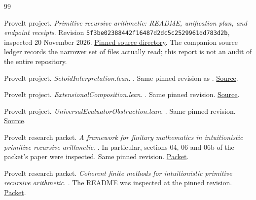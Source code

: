 \begin{thebibliography}{99}

ProveIt project.
\emph{Primitive recursive arithmetic: README, unification plan, and endpoint receipts}.
Revision \texttt{5f3be02388442f16487d2dc5c2529961dd783d2b}, inspected
20 November 2026.
\href{https://github.com/VladimirReshetnikov/ProveIt/tree/5f3be02388442f16487d2dc5c2529961dd783d2b/Logic/PrimitiveRecursiveArithmetic}{Pinned source directory}.
The companion source ledger records the narrower set of files actually read;
this report is not an audit of the entire repository.

ProveIt project.
\emph{SetoidInterpretation.lean}.
.
Same pinned revision as \cite{repoMain}.
\href{https://github.com/VladimirReshetnikov/ProveIt/blob/5f3be02388442f16487d2dc5c2529961dd783d2b/Logic/PrimitiveRecursiveArithmetic/Derivations/Lean/IPRADerivations/Foundations/SetoidInterpretation.lean}{Source}.

ProveIt project.
\emph{ExtensionalComposition.lean}.
.
Same pinned revision.
\href{https://github.com/VladimirReshetnikov/ProveIt/blob/5f3be02388442f16487d2dc5c2529961dd783d2b/Logic/PrimitiveRecursiveArithmetic/Derivations/Lean/IPRADerivations/Foundations/ExtensionalComposition.lean}{Source}.

ProveIt project.
\emph{UniversalEvaluatorObstruction.lean}.
.
Same pinned revision.
\href{https://github.com/VladimirReshetnikov/ProveIt/blob/5f3be02388442f16487d2dc5c2529961dd783d2b/Logic/PrimitiveRecursiveArithmetic/Derivations/Lean/IPRADerivations/Foundations/UniversalEvaluatorObstruction.lean}{Source}.

ProveIt research packet.
\emph{A framework for finitary mathematics in intuitionistic primitive
recursive arithmetic}.
.
In particular, sections 04, 06 and 06b of the packet's paper were inspected.
Same pinned revision.
\href{https://github.com/VladimirReshetnikov/ProveIt/tree/5f3be02388442f16487d2dc5c2529961dd783d2b/Logic/PrimitiveRecursiveArithmetic/docs/proofs/foundations/ipra_framework}{Packet}.

ProveIt research packet.
\emph{Coherent finite methods for intuitionistic primitive recursive arithmetic}.
.
The README was inspected at the pinned revision.
\href{https://github.com/VladimirReshetnikov/ProveIt/tree/5f3be02388442f16487d2dc5c2529961dd783d2b/Logic/PrimitiveRecursiveArithmetic/docs/proofs/foundations/ipra_coherent_methods_2026-11-15}{Packet}.


\end{thebibliography}
